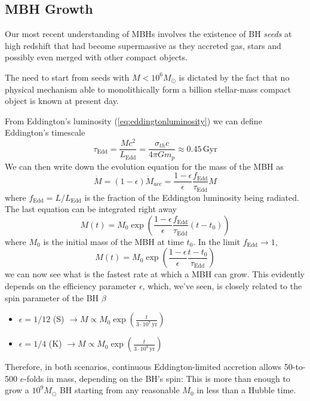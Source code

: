 \subsection{MBH Growth}
Our most recent understanding of MBHs involves the existence of BH \emph{seeds} at high redshift that had become supermassive as they accreted gas, stars and possibly even merged with other compact objects.
\par The need to start from seeds with $M<10^{6}M_{\odot}$ is dictated by the fact that no physical mechanism able to monolithically form a billion stellar-mass compact object is known at present day.
\par From Eddington's luminosity (\ref{eq:eddingtonluminosity}) we can define Eddington's timescale
\begin{equation}
    \tau_{\text{Edd}} = \frac{Mc^{2}}{L_{\text{Edd}}} = \frac{\sigma_{th}c}{4\pi Gm_{p}} \approx 0.45\,\text{Gyr}
    \label{eq:eddington_timescale}
\end{equation}
We can then write down the evolution equation for the mass of the MBH as
\begin{equation*}
    \dot{M} = (1-\epsilon)\dot{M}_{acc} = \frac{1-\epsilon}{\epsilon}\frac{f_{\text{Edd}}}{\tau_{\text{Edd}}}M
\end{equation*}
where $f_{\text{Edd}} = L/L_{\text{Edd}}$ is the fraction of the Eddington luminosity being radiated. The last equation can be integrated right away
\begin{equation*}
    M(t) = M_{0}\exp\left(\frac{1-\epsilon}{\epsilon}\frac{f_{\text{Edd}}}{\tau_{\text{Edd}}}(t-t_{0})\right)
\end{equation*}
where $M_{0}$ is the initial mass of the MBH at time $t_{0}$. In the limit $f_{\text{Edd}}\to 1$, 
\begin{equation*}
    M(t) = M_{0}\exp\left(\frac{1-\epsilon}{\epsilon}\frac{t-t_{0}}{\tau_{\text{Edd}}}\right)
\end{equation*}
we can now see what is the fastest rate at which a MBH can grow. This evidently depends on the eﬃciency parameter $\epsilon$, which, we've seen, is closely related to the spin parameter of the BH $\beta$
\begin{itemize}
    \item $\epsilon = 1/12$ (S) $\to M \propto M_{0}\exp(\frac{t}{3\cdot 10^{7}\,\text{yr}})$
    \item $\epsilon = 1/4$ (K) $\to M \propto M_{0}\exp(\frac{t}{3\cdot 10^{8}\,\text{yr}})$
\end{itemize}
Therefore, in both scenarios, continuous Eddington-limited accretion allows 50-to-500 $e$-folds in mass, depending on the BH's spin: This is more than enough to grow a $10^{9}M_{\odot}$ BH starting from any reasonable $M_{0}$ in less than a Hubble time.
